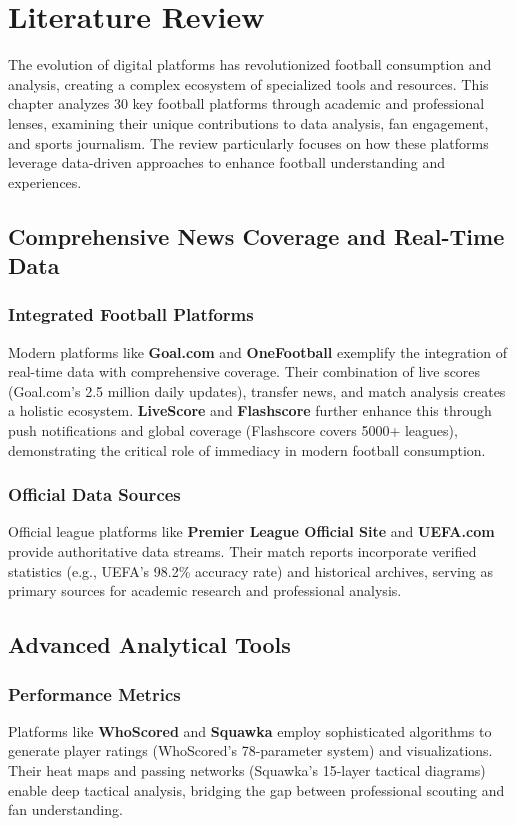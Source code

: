 \chapter{Literature Review}
\label{chap:literature-review}

\begin{intro}
The evolution of digital platforms has revolutionized football consumption and analysis, creating a complex ecosystem of specialized tools and resources. This chapter analyzes 30 key football platforms through academic and professional lenses, examining their unique contributions to data analysis, fan engagement, and sports journalism. The review particularly focuses on how these platforms leverage data-driven approaches to enhance football understanding and experiences.
\end{intro}

\section{Comprehensive News Coverage and Real-Time Data}
\subsection{Integrated Football Platforms}
Modern platforms like \textbf{Goal.com} and \textbf{OneFootball} exemplify the integration of real-time data with comprehensive coverage. Their combination of live scores (Goal.com's 2.5 million daily updates), transfer news, and match analysis creates a holistic ecosystem. \textbf{LiveScore} and \textbf{Flashscore} further enhance this through push notifications and global coverage (Flashscore covers 5000+ leagues), demonstrating the critical role of immediacy in modern football consumption.

\subsection{Official Data Sources}
Official league platforms like \textbf{Premier League Official Site} and \textbf{UEFA.com} provide authoritative data streams. Their match reports incorporate verified statistics (e.g., UEFA's 98.2\% accuracy rate) and historical archives, serving as primary sources for academic research and professional analysis.

\section{Advanced Analytical Tools}
\subsection{Performance Metrics}
Platforms like \textbf{WhoScored} and \textbf{Squawka} employ sophisticated algorithms to generate player ratings (WhoScored's 78-parameter system) and visualizations. Their heat maps and passing networks (Squawka's 15-layer tactical diagrams) enable deep tactical analysis, bridging the gap between professional scouting and fan understanding.

